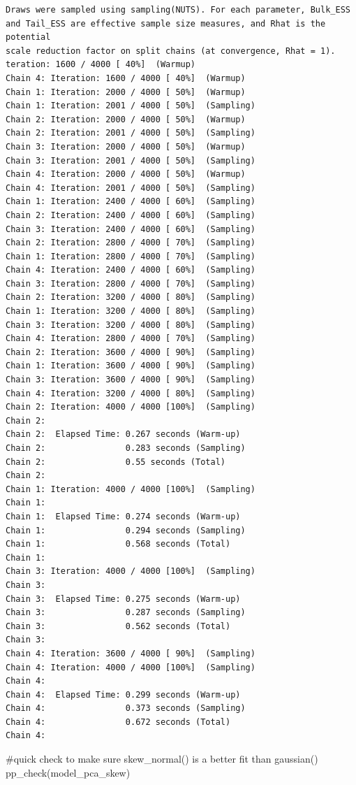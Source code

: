 \documentclass[
  letterpaper,
  DIV=11,
  numbers=noendperiod]{scrartcl}
\newenvironment{Shaded}{\begin{snugshade}}{\end{snugshade}}
\newcommand{\CommentTok}[1]{\textcolor[rgb]{0.37,0.37,0.37}{#1}}
\newcommand{\FunctionTok}[1]{\textcolor[rgb]{0.28,0.35,0.67}{#1}}
\newcommand{\NormalTok}[1]{\textcolor[rgb]{0.00,0.23,0.31}{#1}}
\begin{document}
\begin{verbatim}
Draws were sampled using sampling(NUTS). For each parameter, Bulk_ESS
and Tail_ESS are effective sample size measures, and Rhat is the potential
scale reduction factor on split chains (at convergence, Rhat = 1).
teration: 1600 / 4000 [ 40%]  (Warmup)
Chain 4: Iteration: 1600 / 4000 [ 40%]  (Warmup)
Chain 1: Iteration: 2000 / 4000 [ 50%]  (Warmup)
Chain 1: Iteration: 2001 / 4000 [ 50%]  (Sampling)
Chain 2: Iteration: 2000 / 4000 [ 50%]  (Warmup)
Chain 2: Iteration: 2001 / 4000 [ 50%]  (Sampling)
Chain 3: Iteration: 2000 / 4000 [ 50%]  (Warmup)
Chain 3: Iteration: 2001 / 4000 [ 50%]  (Sampling)
Chain 4: Iteration: 2000 / 4000 [ 50%]  (Warmup)
Chain 4: Iteration: 2001 / 4000 [ 50%]  (Sampling)
Chain 1: Iteration: 2400 / 4000 [ 60%]  (Sampling)
Chain 2: Iteration: 2400 / 4000 [ 60%]  (Sampling)
Chain 3: Iteration: 2400 / 4000 [ 60%]  (Sampling)
Chain 2: Iteration: 2800 / 4000 [ 70%]  (Sampling)
Chain 1: Iteration: 2800 / 4000 [ 70%]  (Sampling)
Chain 4: Iteration: 2400 / 4000 [ 60%]  (Sampling)
Chain 3: Iteration: 2800 / 4000 [ 70%]  (Sampling)
Chain 2: Iteration: 3200 / 4000 [ 80%]  (Sampling)
Chain 1: Iteration: 3200 / 4000 [ 80%]  (Sampling)
Chain 3: Iteration: 3200 / 4000 [ 80%]  (Sampling)
Chain 4: Iteration: 2800 / 4000 [ 70%]  (Sampling)
Chain 2: Iteration: 3600 / 4000 [ 90%]  (Sampling)
Chain 1: Iteration: 3600 / 4000 [ 90%]  (Sampling)
Chain 3: Iteration: 3600 / 4000 [ 90%]  (Sampling)
Chain 4: Iteration: 3200 / 4000 [ 80%]  (Sampling)
Chain 2: Iteration: 4000 / 4000 [100%]  (Sampling)
Chain 2: 
Chain 2:  Elapsed Time: 0.267 seconds (Warm-up)
Chain 2:                0.283 seconds (Sampling)
Chain 2:                0.55 seconds (Total)
Chain 2: 
Chain 1: Iteration: 4000 / 4000 [100%]  (Sampling)
Chain 1: 
Chain 1:  Elapsed Time: 0.274 seconds (Warm-up)
Chain 1:                0.294 seconds (Sampling)
Chain 1:                0.568 seconds (Total)
Chain 1: 
Chain 3: Iteration: 4000 / 4000 [100%]  (Sampling)
Chain 3: 
Chain 3:  Elapsed Time: 0.275 seconds (Warm-up)
Chain 3:                0.287 seconds (Sampling)
Chain 3:                0.562 seconds (Total)
Chain 3: 
Chain 4: Iteration: 3600 / 4000 [ 90%]  (Sampling)
Chain 4: Iteration: 4000 / 4000 [100%]  (Sampling)
Chain 4: 
Chain 4:  Elapsed Time: 0.299 seconds (Warm-up)
Chain 4:                0.373 seconds (Sampling)
Chain 4:                0.672 seconds (Total)
Chain 4: 
\end{verbatim}

\begin{Shaded}
\begin{Highlighting}[]
\CommentTok{\#quick check to make sure skew\_normal() is a better fit than gaussian()}
\FunctionTok{pp\_check}\NormalTok{(model\_pca\_skew)}
\end{Highlighting}
\end{Shaded}
\end{document}
